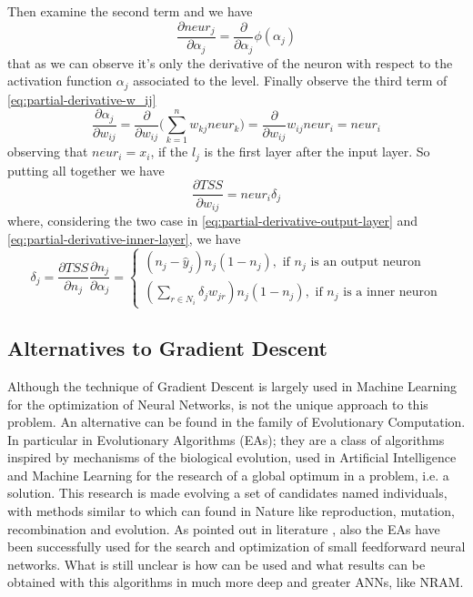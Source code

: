Then examine the second term and we have
\begin{equation}
	\frac{\partial{neur_j}}{\partial{\alpha_j}} = \frac{\partial{}}{\partial{\alpha_j}}\phi(\alpha_j)
\end{equation}
that as we can observe it's only the derivative of the neuron with respect to the activation function $\alpha_j$ associated to the level.\newline\newline
Finally observe the third term of \ref{eq:partial-derivative-w_ij}
\begin{equation}
	\frac{\partial{\alpha_j}}{\partial{w_{ij}}} = \frac{\partial{}}{\partial{w_{ij}}}\Bigg(\sum\limits_{k=1}^n w_{kj}neur_k\Bigg) = \frac{\partial{}}{\partial{w_{ij}}}w_{ij}neur_i = neur_i
\end{equation}
observing that $neur_i = x_i$, if the $l_j$ is the first layer after the input layer.\newline\newline
So putting all together we have 
\begin{equation}
	\frac{\partial{TSS}}{\partial{w_{ij}}} = neur_i\delta_j
\end{equation}
where, considering the two case in \ref{eq:partial-derivative-output-layer} and \ref{eq:partial-derivative-inner-layer}, we have
\begin{equation}
	\delta_j = \frac{\partial{TSS}}{\partial{n_j}}\frac{\partial{n_j}}{\partial{\alpha_j}} = \left.
	\begin{cases}
		(n_j - \hat{y}_j)n_j(1 - n_j),\textrm{ if } n_j \textrm{ is an output neuron} \\
(\sum\limits_{r	\in N_i}\delta_{j}w_{jr})n_{j}(1 - n_{j}), \textrm{ if }n_j\textrm{ is a inner neuron}
	\end{cases}\right.
\end{equation}

\subsection{Alternatives to Gradient Descent}
Although the technique of Gradient Descent is largely used in Machine Learning for the optimization of Neural Networks, is not the unique approach to this problem. An alternative can be found in the family of Evolutionary Computation. In particular in Evolutionary Algorithms (EAs); they are a class of algorithms inspired by mechanisms of the biological evolution, used in Artificial Intelligence and Machine Learning for the research of a global optimum in a problem, i.e. a solution. This research is made evolving a set of candidates named individuals, with methods similar to which can found in Nature like reproduction, mutation, recombination and evolution. As pointed out in literature \cite{Ilonen2003DifferentialET, Morse2016SimpleEO}, also the EAs have been successfully used for the search and optimization of small feedforward neural networks. What is still unclear is how can be used and what results can be obtained with this algorithms in much more deep and greater ANNs, like NRAM.